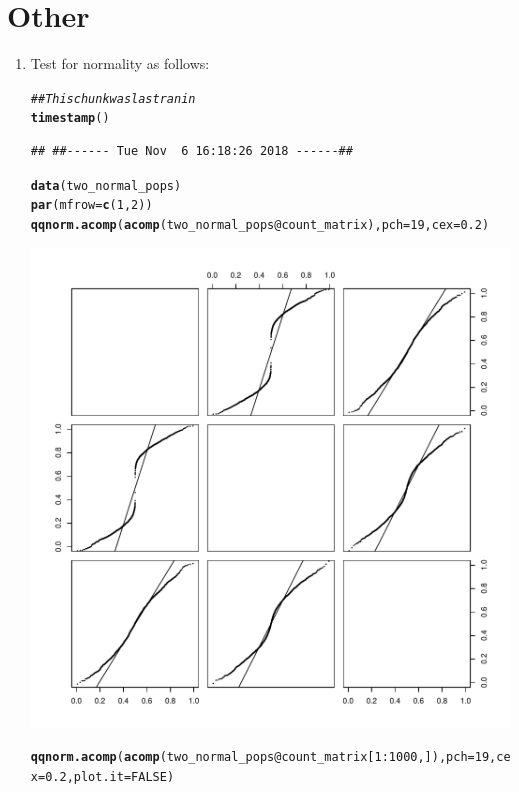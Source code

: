 \documentclass{article}\usepackage[]{graphicx}\usepackage[]{color}
\makeatletter
\def\maxwidth{ %
  \ifdim\Gin@nat@width>\linewidth
    \linewidth
  \else
    \Gin@nat@width
  \fi
}
\newcommand{\hlnum}[1]{\textcolor[rgb]{0.686,0.059,0.569}{#1}}%
\newcommand{\hlcom}[1]{\textcolor[rgb]{0.678,0.584,0.686}{\textit{#1}}}%
\newcommand{\hlopt}[1]{\textcolor[rgb]{0,0,0}{#1}}%
\newcommand{\hlstd}[1]{\textcolor[rgb]{0.345,0.345,0.345}{#1}}%
\newcommand{\hlkwc}[1]{\textcolor[rgb]{0.333,0.667,0.333}{#1}}%
\newcommand{\hlkwd}[1]{\textcolor[rgb]{0.737,0.353,0.396}{\textbf{#1}}}%
\newenvironment{kframe}{%
 \def\at@end@of@kframe{}%
 \ifinner\ifhmode%
  \def\at@end@of@kframe{\end{minipage}}%
  \begin{minipage}{\columnwidth}%
 \fi\fi%
 \def\FrameCommand##1{\hskip\@totalleftmargin \hskip-\fboxsep
 \colorbox{shadecolor}{##1}\hskip-\fboxsep
     \hskip-\linewidth \hskip-\@totalleftmargin \hskip\columnwidth}%
 \MakeFramed {\advance\hsize-\width
   \@totalleftmargin\z@ \linewidth\hsize
   \@setminipage}}%
 {\par\unskip\endMakeFramed%
 \at@end@of@kframe}
\newenvironment{knitrout}{}{} %
\makeatother
\begin{document}
\section{Other}
\begin{enumerate}
\item Test for normality as follows:
\begin{knitrout}
\color{fgcolor}\begin{kframe}
\begin{alltt}
\hlcom{## This chunk was last ran in}
\hlkwd{timestamp}\hlstd{()}
\end{alltt}
\begin{verbatim}
## ##------ Tue Nov  6 16:18:26 2018 ------##
\end{verbatim}
\begin{alltt}
\hlkwd{data}\hlstd{(two_normal_pops)}
\hlkwd{par}\hlstd{(}\hlkwc{mfrow}\hlstd{=}\hlkwd{c}\hlstd{(}\hlnum{1}\hlstd{,}\hlnum{2}\hlstd{))}
\hlkwd{qqnorm.acomp}\hlstd{(}\hlkwd{acomp}\hlstd{(two_normal_pops}\hlopt{@}\hlkwc{count_matrix}\hlstd{),} \hlkwc{pch}\hlstd{=}\hlnum{19}\hlstd{,} \hlkwc{cex}\hlstd{=}\hlnum{0.2}\hlstd{)}
\end{alltt}
\end{kframe}
\includegraphics[width=\maxwidth]{figure/unnamed-chunk-7-1} 
\begin{kframe}\begin{alltt}
\hlkwd{qqnorm.acomp}\hlstd{(}\hlkwd{acomp}\hlstd{(two_normal_pops}\hlopt{@}\hlkwc{count_matrix}\hlstd{[}\hlnum{1}\hlopt{:}\hlnum{1000}\hlstd{,]),} \hlkwc{pch}\hlstd{=}\hlnum{19}\hlstd{,} \hlkwc{cex}\hlstd{=}\hlnum{0.2}\hlstd{,} \hlkwc{plot.it}\hlstd{=}\hlnum{FALSE}\hlstd{)}
\end{alltt}



\end{kframe}
\end{knitrout}
\end{enumerate}
\end{document}
